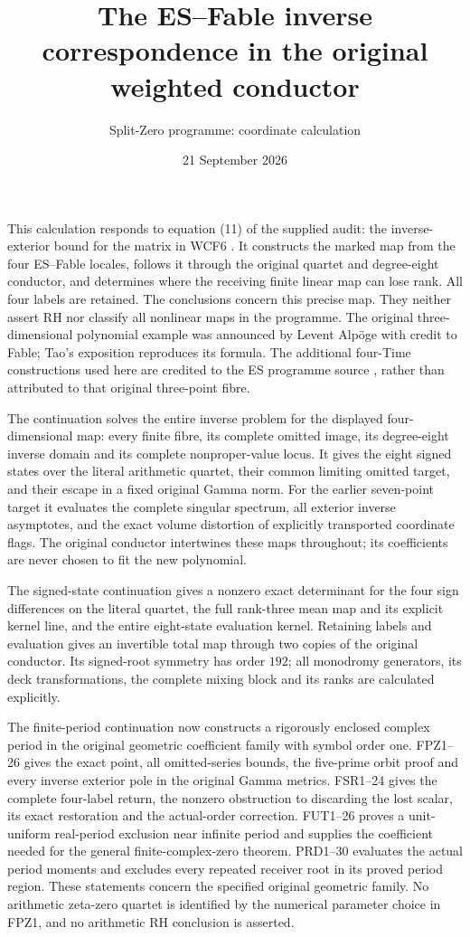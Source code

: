 \documentclass[11pt]{article}
\title{The ES--Fable inverse correspondence in the original weighted conductor}
\author{Split-Zero programme: coordinate calculation}
\date{21 September 2026}
\begin{document}
\maketitle

This calculation responds to equation (11) of the supplied audit: the
inverse-exterior bound for the matrix in WCF6 \cite{WCF}. It constructs
the marked map from the four ES--Fable locales, follows it through the
original quartet and degree-eight conductor, and determines where the
receiving finite linear map can lose rank. All four labels are retained.
The conclusions concern this precise map. They neither assert RH nor
classify all nonlinear maps in the programme.
The original three-dimensional polynomial example was announced by
Levent Alp\"oge with credit to Fable; Tao's exposition \cite{Tao}
reproduces its formula. The additional four-Time constructions used here
are credited to the ES programme source \cite{ES}, rather than attributed
to that original three-point fibre.

The continuation solves the entire inverse problem for the displayed
four-dimensional map: every finite fibre, its complete omitted image,
its degree-eight inverse domain and its complete nonproper-value locus.
It gives the eight signed states over the literal arithmetic quartet,
their common limiting omitted target, and their escape in a fixed
original Gamma norm. For the earlier seven-point target it evaluates
the complete singular spectrum, all exterior inverse asymptotes, and
the exact volume distortion of explicitly transported coordinate flags.
The original conductor intertwines these maps throughout; its coefficients
are never chosen to fit the new polynomial.

The signed-state continuation gives a nonzero exact determinant for the
four sign differences on the literal quartet, the full rank-three mean
map and its explicit kernel line, and the entire eight-state evaluation
kernel. Retaining labels and evaluation gives an invertible total map
through two copies of the original conductor. Its signed-root symmetry
has order $192$; all monodromy generators, its deck transformations,
the complete mixing block and its ranks are calculated explicitly.


The finite-period continuation now constructs a rigorously enclosed complex
period in the original geometric coefficient family with symbol order one.
FPZ1--26 gives the exact point, all omitted-series bounds, the five-prime
orbit proof and every inverse exterior pole in the original Gamma metrics.
FSR1--24 gives the complete four-label return, the nonzero obstruction to
discarding the lost scalar, its exact restoration and the actual-order
correction. FUT1--26 proves a unit-uniform real-period exclusion near
infinite period and supplies the coefficient needed for the general
finite-complex-zero theorem. PRD1--30 evaluates the actual period moments
and excludes every repeated receiver root in its proved period region.
These statements concern the specified original geometric family.
No arithmetic zeta-zero quartet is identified by the numerical parameter
choice in FPZ1, and no arithmetic RH conclusion is asserted.
\end{document}
